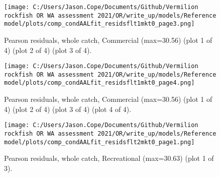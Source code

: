 \documentclass[11pt,
  english,
  a4paper,
]{article}
\begin{document}
\tagmcend\tagstructend


\begin{figure}
\centering
\texttt{[image: C:/Users/Jason.Cope/Documents/Github/Vermilion rockfish OR WA assessment 2021/OR/write\_up/models/Reference model/plots/comp\_condAALfit\_residsflt1mkt0\_page3.png]}
\caption{Pearson residuals, whole catch, Commercial (max=30.56) (plot 1 of 4) (plot 2 of 4) (plot 3 of 4).\label{fig:comp_condAALfit_residsflt1mkt0_page3}}
\end{figure}

\tagmcend\tagstructend


\begin{figure}
\centering
\texttt{[image: C:/Users/Jason.Cope/Documents/Github/Vermilion rockfish OR WA assessment 2021/OR/write\_up/models/Reference model/plots/comp\_condAALfit\_residsflt1mkt0\_page4.png]}
\caption{Pearson residuals, whole catch, Commercial (max=30.56) (plot 1 of 4) (plot 2 of 4) (plot 3 of 4) (plot 4 of 4).\label{fig:comp_condAALfit_residsflt1mkt0_page4}}
\end{figure}

\tagmcend\tagstructend


\begin{figure}
\centering
\texttt{[image: C:/Users/Jason.Cope/Documents/Github/Vermilion rockfish OR WA assessment 2021/OR/write\_up/models/Reference model/plots/comp\_condAALfit\_residsflt2mkt0\_page1.png]}
\caption{Pearson residuals, whole catch, Recreational (max=30.63) (plot 1 of 3).\label{fig:comp_condAALfit_residsflt2mkt0_page1}}
\end{figure}

\tagmcend\tagstructend

\end{document}
